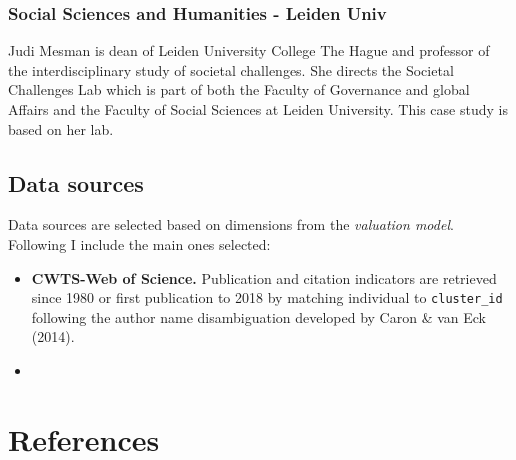 \documentclass[]{elsarticle} %
\begin{document}
\hypertarget{social-sciences-and-humanities---leiden-univ}{%
\subsubsection{Social Sciences and Humanities - Leiden
Univ}\label{social-sciences-and-humanities---leiden-univ}}

Judi Mesman is dean of Leiden University College The Hague and professor
of the interdisciplinary study of societal challenges. She directs the
Societal Challenges Lab which is part of both the Faculty of Governance
and global Affairs and the Faculty of Social Sciences at Leiden
University. This case study is based on her lab.

\hypertarget{data-sources}{%
\subsection{Data sources}\label{data-sources}}

Data sources are selected based on dimensions from the \emph{valuation
model}. Following I include the main ones selected:

\begin{itemize}
\item
  \textbf{CWTS-Web of Science.} Publication and citation indicators are
  retrieved since 1980 or first publication to 2018 by matching
  individual to \texttt{cluster\_id} following the author name
  disambiguation developed by Caron \& van Eck (2014).
\item
\end{itemize}

\pagebreak

\hypertarget{references}{%
\section{References}\label{references}}
\end{document}
